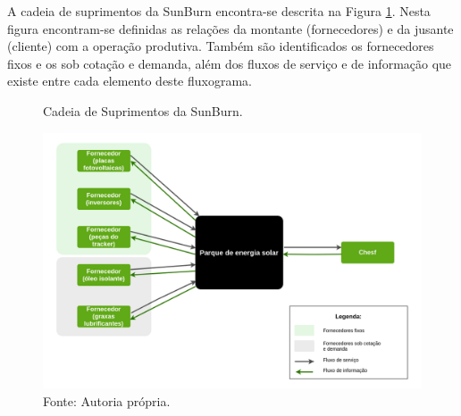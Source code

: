 \par A cadeia de suprimentos da SunBurn encontra-se descrita na Figura \ref{fig:cadeia_suprimentos_sunburn}. Nesta figura encontram-se definidas as relações da montante (fornecedores) e da jusante (cliente) com a operação produtiva. Também são identificados os fornecedores fixos e os sob cotação e demanda, além dos fluxos de serviço e de informação que existe entre cada elemento deste fluxograma. 


\begin{figure}[H]
    \centering
    \caption{Cadeia de Suprimentos da SunBurn.}
    \includegraphics[width = \textwidth]{images/cadeia_suprimentos_sunburn.png}
    \caption*{Fonte: Autoria própria.}
    \label{fig:cadeia_suprimentos_sunburn}
\end{figure}
  

